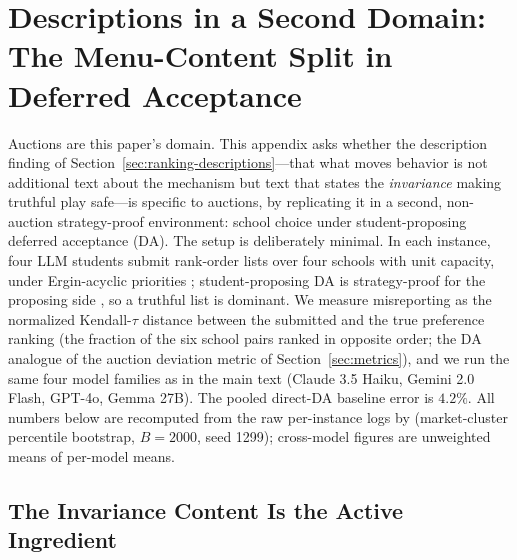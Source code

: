\section{Descriptions in a Second Domain: The Menu-Content Split in Deferred Acceptance}\label{app:da}

Auctions are this paper's domain. This appendix asks whether the description finding of Section~\ref{sec:ranking-descriptions}---that what moves behavior is not additional text about the mechanism but text that states the \emph{invariance} making truthful play safe---is specific to auctions, by replicating it in a second, non-auction strategy-proof environment: school choice under student-proposing deferred acceptance (DA). The setup is deliberately minimal. In each instance, four LLM students submit rank-order lists over four schools with unit capacity, under Ergin-acyclic priorities \citep{ergin2002efficient,ashlagi2018stable}; student-proposing DA is strategy-proof for the proposing side \citep{roth1982economics}, so a truthful list is dominant. We measure misreporting as the normalized Kendall-$\tau$ distance between the submitted and the true preference ranking (the fraction of the six school pairs ranked in opposite order; the DA analogue of the auction deviation metric of Section~\ref{sec:metrics}), and we run the same four model families as in the main text (Claude 3.5 Haiku, Gemini 2.0 Flash, GPT-4o, Gemma 27B). The pooled direct-DA baseline error is $4.2\%$. All numbers below are recomputed from the raw per-instance logs by  (market-cluster percentile bootstrap, $B = 2000$, seed 1299); cross-model figures are unweighted means of per-model means.

\subsection{The Invariance Content Is the Active Ingredient}\label{app:da-descriptions}

